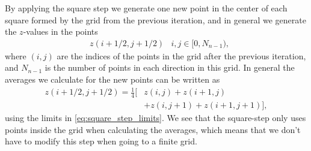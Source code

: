 By applying the square step we generate one new point in the center of each square formed by the grid from the previous iteration, and in general we generate the $z$-values in the points
\begin{align}
    &z(i+1/2, j+1/2) & i,j \in [0, N_{n-1}), \label{eq:square_step_limits}
\end{align}
where $(i,j)$ are the indices of the points in the grid after the previous iteration, and $N_{n-1}$ is the number of points in each direction in this grid. In general the averages we calculate for the new points can be written as
\begin{align}
    z(i+1/2, j+1/2) 
    = \frac{1}{4}\Big[
        &z(i, j) + z(i+1, j) \nonumber\\
        &+ z(i, j+1) + z(i+1, j+1)
    \Big],
    \label{eq:square_step}
\end{align}
using the limits in \cref{eq:square_step_limits}. We see that the square-step only uses points inside the grid when calculating the averages, which means that we don't have to modify this step when going to a finite grid.

